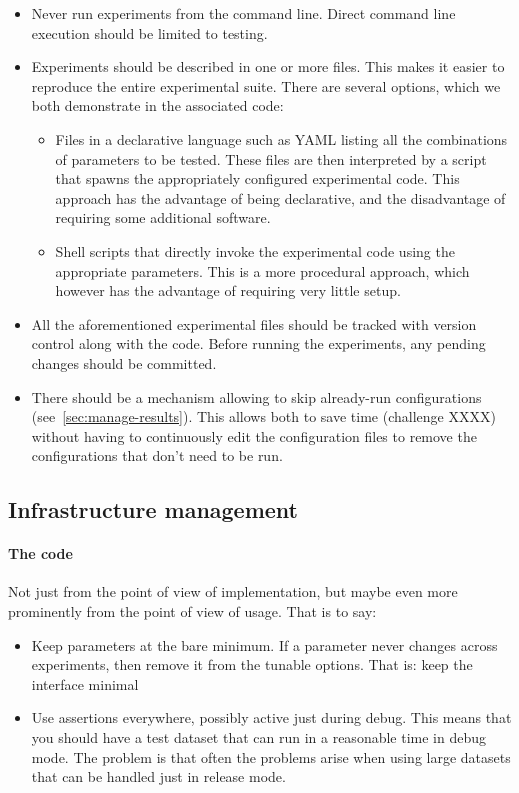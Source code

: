 \documentclass{llncs}
\begin{document}
\begin{itemize}
\item Never run experiments from the command line. Direct command line execution
  should be limited to testing.
\item Experiments should be described in one or more files. This makes it easier
  to reproduce the entire experimental suite. There are several options, which we both 
  demonstrate in the associated code:
  \begin{itemize}
    \item Files in a declarative language such as YAML listing all the combinations of
    parameters to be tested. These files are then interpreted by a script that spawns
    the appropriately configured experimental code. This approach has the advantage of
    being declarative, and the disadvantage of requiring some additional software.
    \item Shell scripts that directly invoke the experimental code using 
      the appropriate parameters. This is a more procedural approach, which however has
      the advantage of requiring very little setup.
  \end{itemize}
\item All the aforementioned experimental files should be tracked with version 
  control along with the code. Before running the experiments, any pending changes should
  be committed.
\item There should be a mechanism allowing to skip already-run configurations (see~\ref{sec:manage-results}).
  This allows both to save time (challenge XXXX) without having to continuously edit
  the configuration files to remove the configurations that don't need to be run.
\end{itemize}

\subsection{Infrastructure management}

\paragraph{The code}

Not just from the point of view of implementation, but maybe even more
prominently from the point of view of usage. That is to say:

\begin{itemize}
\item Keep parameters at the bare minimum. If a parameter never changes across
  experiments, then remove it from the tunable options. That is: keep the
  interface minimal
\item Use assertions everywhere, possibly active just during debug. This means that
  you should have a test dataset that can run in a reasonable time in debug
  mode. The problem is that often the problems arise when using large datasets
  that can be handled just in release mode.
\end{itemize}
\end{document}
